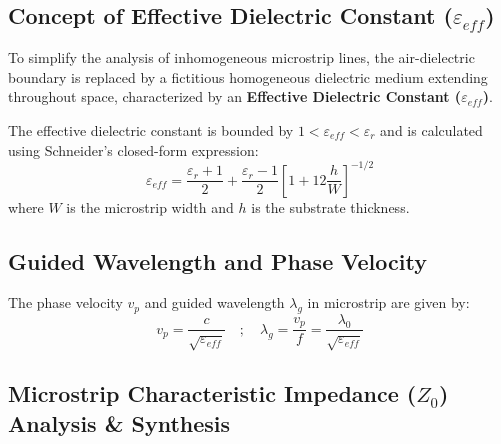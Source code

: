 \documentclass[12pt,a4paper]{article}
\begin{document}
\subsection{Concept of Effective Dielectric Constant (\texorpdfstring{$\varepsilon_{eff}$}{epsilon\_eff})}
To simplify the analysis of inhomogeneous microstrip lines, the air-dielectric boundary is replaced by a fictitious homogeneous dielectric medium extending throughout space, characterized by an \textbf{Effective Dielectric Constant ($\varepsilon_{eff}$)}.

\begin{tcolorbox}[formulabox, title={Effective Dielectric Constant ($\varepsilon_{eff}$) Formula}]
  The effective dielectric constant is bounded by $1 < \varepsilon_{eff} < \varepsilon_r$ and is calculated using Schneider's closed-form expression:
  \begin{equation}
    \varepsilon_{eff} = \frac{\varepsilon_r + 1}{2} + \frac{\varepsilon_r - 1}{2} \left[ 1 + 12\frac{h}{W} \right]^{-1/2}
  \end{equation}
  where $W$ is the microstrip width and $h$ is the substrate thickness.
\end{tcolorbox}

\subsection{Guided Wavelength and Phase Velocity}
The phase velocity $v_p$ and guided wavelength $\lambda_g$ in microstrip are given by:
\begin{equation}
  v_p = \frac{c}{\sqrt{\varepsilon_{eff}}} \quad ; \quad \lambda_g = \frac{v_p}{f} = \frac{\lambda_0}{\sqrt{\varepsilon_{eff}}}
\end{equation}

\subsection{Microstrip Characteristic Impedance (\texorpdfstring{$Z_0$}{Z0}) Analysis \& Synthesis}
\end{document}
